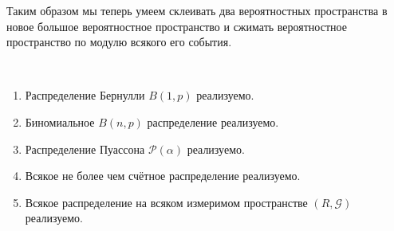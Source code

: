 \documentclass[12pt,a4paper]{article}
\begin{document}
    \begin{theorem}
    \end{theorem}

    \begin{remark*}
        Таким образом мы теперь умеем склеивать два вероятностных пространства в новое большое вероятностное пространство и сжимать вероятностное пространство по модулю всякого его события.
    \end{remark*}

    \begin{theorem}\ 
        \begin{enumerate}
            \item Распределение Бернулли $B(1, p)$ реализуемо.
            \item Биномиальное $B(n, p)$ распределение реализуемо.
            \item Распределение Пуассона $\mathcal{P}(\alpha)$ реализуемо.
            \item Всякое не более чем счётное распределение реализуемо.
            \item Всякое распределение на всяком измеримом пространстве $(R, \mathcal{G})$ реализуемо.
        \end{enumerate}
    \end{theorem}
\end{document}
